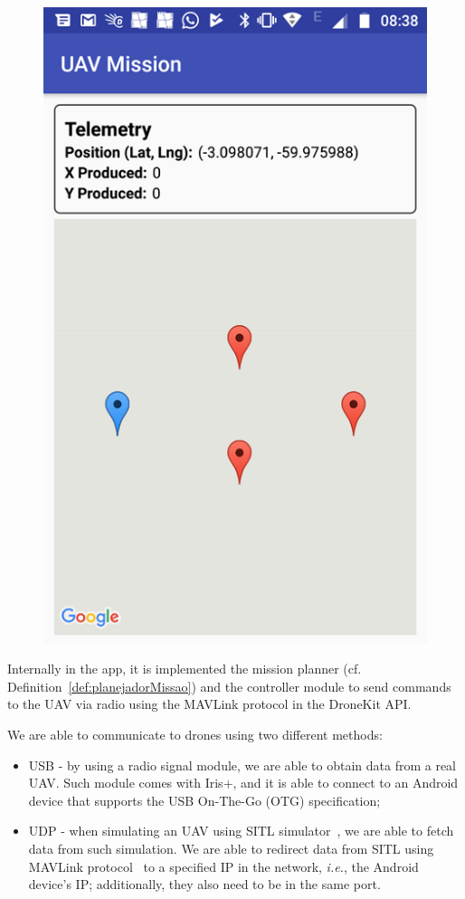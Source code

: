 \documentclass[12pt]{article}
\begin{document}
\begin{figure}[]
\begin{minipage}{.55\textwidth}
  \includegraphics[width=.7\linewidth]{appSec}
  \label{fig:appSec}
\end{minipage}
\end{figure}

Internally in the app, it is implemented the mission planner (cf. Definition~\ref{def:planejadorMissao}) and the controller module to send commands to the UAV via radio using the MAVLink protocol in the DroneKit API.

We are able to communicate to drones using two different methods:
\begin{itemize}
\item USB - by using a radio signal module, we are able to obtain data from a real UAV. Such module comes with Iris+, and it is able to connect to an Android device that supports the USB On-The-Go (OTG) specification;
\item UDP - when simulating an UAV using SITL simulator~\cite{team2016sitl}, we are able to fetch data from such simulation. We are able to redirect data from SITL using MAVLink protocol~\cite{mavilink} to a specified IP in the network, \textit{i.e.}, the Android device's IP; additionally, they also need to be in the same port.
\end{itemize}
\end{document}
